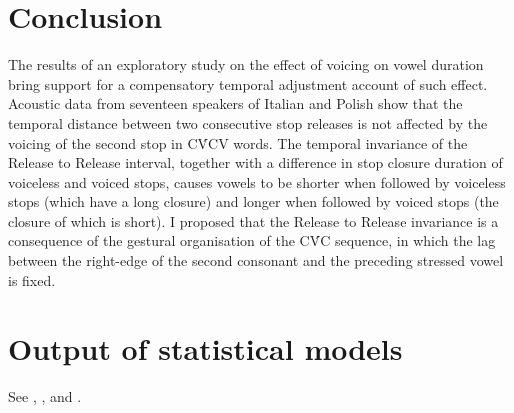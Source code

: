 \documentclass[preprint]{JASAnew}
\begin{document}
\hypertarget{conclusion}{%
\section{Conclusion}\label{conclusion}}

The results of an exploratory study on the effect of voicing on vowel
duration bring support for a compensatory temporal adjustment account of
such effect. Acoustic data from seventeen speakers of Italian and Polish
show that the temporal distance between two consecutive stop releases is
not affected by the voicing of the second stop in CV́CV words. The
temporal invariance of the Release to Release interval, together with a
difference in stop closure duration of voiceless and voiced stops,
causes vowels to be shorter when followed by voiceless stops (which have
a long closure) and longer when followed by voiced stops (the closure of
which is short). I proposed that the Release to Release invariance is a
consequence of the gestural organisation of the CV́C sequence, in which
the lag between the right-edge of the second consonant and the preceding
stressed vowel is fixed.

\appendix

\hypertarget{output-of-statistical-models}{%
\section{Output of statistical
models}\label{output-of-statistical-models}}

\label{a:stats}

See , , and
.
\end{document}
